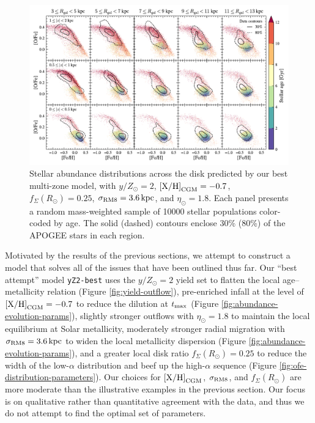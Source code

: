 \documentclass[twocolumn,twocolappendix,linenumbers]{aastex631}
\newcommand{\mathXH}{{\rm [X/H]}}
\newcommand{\yZ}[1]{$y/Z_\odot=#1$}
\newcommand{\kpc}{\,{\rm kpc}}
\begin{document}
\begin{figure}
    \centering
    \includegraphics[width=\linewidth]{figures/ofe_feh_best.pdf}
    \caption{Stellar abundance distributions across the disk predicted by our best multi-zone model, with \yZ{2}, ${\rm [X/H]}_{\rm CGM}=-0.7$, $f_\Sigma(R_\odot)=0.25$, $\sigma_{\rm RM8}=3.6\kpc$, and $\eta_\odot=1.8$. Each panel presents a random mass-weighted sample of \num{10000} stellar populations color-coded by age. 
    The solid (dashed) contours enclose 30\% (80\%) of the APOGEE stars in each region. 
    }
    \label{fig:ofe-feh-best}
\end{figure}

Motivated by the results of the previous sections, we attempt to construct a model that solves all of the issues that have been outlined thus far. Our ``best attempt'' model {\tt yZ2-best} uses the \yZ{2} yield set to flatten the local age--metallicity relation (Figure \ref{fig:yield-outflow}), pre-enriched infall at the level of $\mathXH_{\rm CGM}=-0.7$ to reduce the dilution at $t_{\rm max}$ (Figure \ref{fig:abundance-evolution-params}), slightly stronger outflows with $\eta_\odot=1.8$ to maintain the local equilibrium at Solar metallicity, moderately stronger radial migration with $\sigma_{\rm RM8}=3.6\kpc$ to widen the local metallicity dispersion (Figure \ref{fig:abundance-evolution-params}), and a greater local disk ratio $f_\Sigma(R_\odot)=0.25$ to reduce the width of the low-$\alpha$ distribution and beef up the high-$\alpha$ sequence (Figure \ref{fig:ofe-distribution-parameters}). Our choices for $\mathXH_{\rm CGM}$, $\sigma_{\rm RM8}$, and $f_\Sigma(R_\odot)$ are more moderate than the illustrative examples in the previous section. Our focus is on qualitative rather than quantitative agreement with the data, and thus we do not attempt to find the optimal set of parameters.
\end{document}
